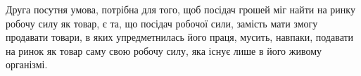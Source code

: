 Друга посутня умова, потрібна для того, щоб посідач грошей
міг найти на ринку робочу силу як товар, є та, що посідач робочої
сили, замість мати змогу продавати товари, в яких упредметнилась
його праця, мусить, навпаки, подавати на ринок як товар
саму свою робочу силу, яка існує лише в його живому організмі.
